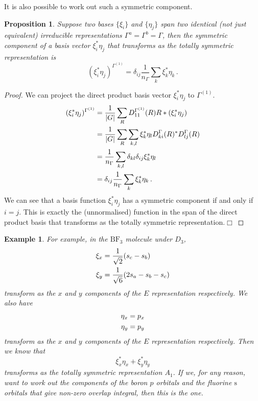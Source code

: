 \documentclass{article}
\theoremstyle{plain}\theoremheaderfont{\normalfont\itshape}\theorembodyfont{\rmfamily}\theoremseparator{.}\newtheorem*{rem}{Remark}\newtheorem*{ex}{Example}\newtheorem*{proof}{Proof}\newtheorem*{altp}{Alternative proof}
\theoremstyle{plain}\theoremheaderfont{\normalfont\bfseries}\theorembodyfont{\rmfamily}\theoremseparator{.}\newtheorem{thm}{Theorem}[section]\newtheorem{lem}[thm]{Lemma}\newtheorem{prop}[thm]{Proposition}\newtheorem*{cor}{Corollary}\newtheorem{defn}[thm]{Definition}\newtheorem{clm}[thm]{Claim}\newtheorem{clminproof}{Claim}\newtheorem*{law}{Law}\newtheorem{pos}[thm]{Postulate}
\theoremstyle{break}\theoremheaderfont{\normalfont\itshape}\theorembodyfont{\rmfamily}\theoremseparator{.\medskip}\newtheorem*{proofskip}{Proof}\newtheorem*{exs}{Examples}\newtheorem*{rems}{Remarks}
\theoremstyle{break}\theoremheaderfont{\normalfont\bfseries}\theorembodyfont{\rmfamily}\theoremseparator{.\medskip}\newtheorem{lemskip}[thm]{Lemma}\newtheorem{defnskip}[thm]{Definition}\newtheorem{propskip}[thm]{Proposition}\newtheorem{thmskip}[thm]{Theorem}
\numberwithin{equation}{section}
\newcommand{\qed}{\hfill\ensuremath{\Box}}
\newcommand{\abs}[1]{\left| #1 \right|}
\begin{document}
    It is also possible to work out such a symmetric component.
    \begin{prop}
        Suppose two bases \(\{\xi_i\}\) and \(\{\eta_j\}\) span two identical (not just equivalent) irreducible representations \(\Gamma^a=\Gamma^b=\Gamma\), then the symmetric component of a basis vector \(\xi_i^*\eta_j\) that transforms as the totally symmetric representation is
        \begin{equation}
            (\xi_i^*\eta_j)^{\Gamma^{(1)}}=\delta_{ij}\frac{1}{n_\Gamma}\sum_k\xi_k^*\eta_k\,.
        \end{equation}
    \end{prop}
    \begin{proof}
        We can project the direct product basis vector \(\xi_i^*\eta_j\) to \(\Gamma^{(1)}\).
        \begin{align}
            (\xi_i^*\eta_j)^{\Gamma^{(1)}}&=\frac{1}{\abs{G}}\sum_R D_{11}^{\Gamma^{(1)}}(R)R*(\xi_i^*\eta_j)\notag\\
            &=\frac{1}{\abs{G}}\sum_R\sum_{k,l}\xi_k^*\eta_l D_{ki}^{\Gamma}(R)^* D_{lj}^{\Gamma}(R)\notag\\
            &=\frac{1}{n_{\Gamma}}\sum_{k,l}\delta_{kl}\delta_{ij}\xi_k^*\eta_l\notag\\
            &=\delta_{ij}\frac{1}{n_{\Gamma}}\sum_k\xi_k^*\eta_k\,.
        \end{align}
        We can see that a basis function \(\xi_i^*\eta_j\) has a symmetric component if and only if \(i=j\). This is exactly the (unnormalised) function in the span of the direct product basis that transforms as the totally symmetric representation.\qed
    \end{proof}
    \begin{ex}
        For example, in the \(\mathrm{BF_3}\) molecule under \(D_3\),
        \begin{align}
            \xi_x&=\frac{1}{\sqrt{2}}(s_c-s_b)\notag\\
            \xi_y&=\frac{1}{\sqrt{6}}(2s_a-s_b-s_c)
        \end{align}
        transform as the \(x\) and \(y\) components of the \(E\) representation respectively. We also have
        \begin{align}
            \eta_x&=p_x\notag\\
            \eta_y&=p_y
        \end{align}
        transform as the \(x\) and \(y\) components of the \(E\) representation respectively. Then we know that
        \begin{equation}
            \xi_x^*\eta_x+\xi_y^*\eta_y
        \end{equation}
        transforms as the totally symmetric representation \(A_1\). If we, for any reason, want to work out the components of the boron \(p\) orbitals and the fluorine \(\mathrm{s}\) orbitals that give non-zero overlap integral, then this is the one.
    \end{ex}
\end{document}
